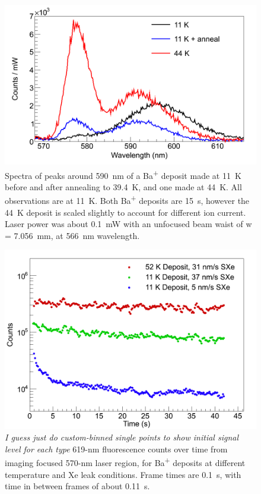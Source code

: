 \begin{figure} %
        \centering
                \includegraphics[width=.7\textwidth]{figures/spectra_temperature_conditions.png}
                \caption{Spectra of peaks around 590~nm of a Ba\textsuperscript{+} deposit made at 11~K before and after annealing to 39.4~K, and one made at 44~K.  All observations are at 11~K.  Both Ba\textsuperscript{+} deposits are 15~s, however the 44~K deposit is scaled slightly to account for different ion current.  Laser power was about 0.1~mW with an unfocused beam waist of w = 7.056~mm, at 566~nm wavelength.}
\label{fig:specTempConditions}
\end{figure}

\begin{figure} [h]
        \centering
                \includegraphics[width=.7\textwidth]{figures/619_deposit_conditions.png}
                \caption{\emph{\color{gray}I guess just do custom-binned single points to show initial signal level for each type} 619-nm fluorescence counts over time from imaging focused 570-nm laser region, for Ba\textsuperscript{+} deposits at different temperature and Xe leak conditions.  Frame times are 0.1~s, with time in between frames of about 0.11~s.}
\label{fig:specTempConditions619}
\end{figure}

